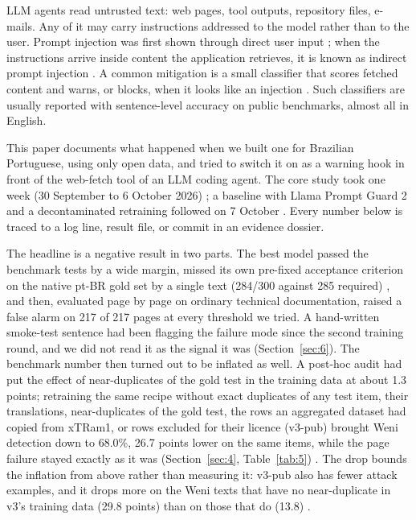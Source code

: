 \documentclass[11pt]{article}
\begin{document}
LLM agents read untrusted text: web pages, tool outputs, repository files, e-mails. Any of it may carry instructions addressed to the model rather than to the user. Prompt injection was first shown through direct user input \citep{perez2022ignore}; when the instructions arrive inside content the application retrieves, it is known as indirect prompt injection \citep{greshake2023indirect, liu2024formalizing}. A common mitigation is a small classifier that scores fetched content and warns, or blocks, when it looks like an injection \citep{protectai2024deberta, meta2025promptguard2, jacob2025promptshield}. Such classifiers are usually reported with sentence-level accuracy on public benchmarks, almost all in English.

This paper documents what happened when we built one for Brazilian Portuguese, using only open data, and tried to switch it on as a warning hook in front of the web-fetch tool of an LLM coding agent. The core study took one week (30 September to 6 October 2026)%
; a baseline with Llama Prompt Guard 2 and a decontaminated retraining followed on 7 October%
. Every number below is traced to a log line, result file, or commit in an evidence dossier.

The headline is a negative result in two parts. The best model passed the benchmark tests by a wide margin, missed its own pre-fixed acceptance criterion on the native pt-BR gold set by a single text (284/300 against 285 required)%
, and then, evaluated page by page on ordinary technical documentation, raised a false alarm on 217 of 217 pages %
at every threshold we tried. A hand-written smoke-test sentence had been flagging the failure mode since the second training round, and we did not read it as the signal it was (Section~\ref{sec:6}). The benchmark number then turned out to be inflated as well. A post-hoc audit had put the effect of near-duplicates of the gold test in the training data at about 1.3 points; retraining the same recipe without exact duplicates of any test item, their translations, near-duplicates of the gold test, the rows an aggregated dataset had copied from xTRam1, or rows excluded for their licence (v3-pub) brought Weni detection down to 68.0\%, 26.7 points lower on the same items, while the page failure stayed exactly as it was (Section~\ref{sec:4}, Table~\ref{tab:5})%
. The drop bounds the inflation from above rather than measuring it: v3-pub also has fewer attack examples, and it drops more on the Weni texts that have no near-duplicate in v3's training data (29.8 points) than on those that do (13.8)%
.
\end{document}
